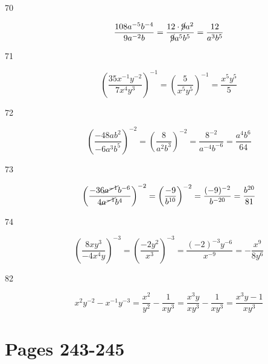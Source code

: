 \documentclass[fleqn,addpoints]{exam}
\begin{document}
\begin{description}
\item[70]
\[
  \frac{108a^{-5}b^{-4}}{9a^{-2}b} = \frac{12 \cdot \cancel{9}a^2}{\cancel{9}a^5b^5} = \frac{12}{a^3b^5}
\]

\item[71]
\[
  \left( \frac{35x^{-1}y^{-2}}{7x^4y^3} \right)^{-1} = \left( \frac{5}{x^5y^5} \right)^{-1} = \frac{x^5y^5}{5}
\]

\item[72]
\[
  \left( \frac{-48ab^2}{-6a^3b^5} \right)^{-2} = \left( \frac{8}{a^2b^3} \right)^{-2} = \frac{8^{-2}}{a^{-4}b^{-6}} = \frac{a^4b^6}{64}
\]

\item[73]
\[
  \left( \frac{-36 \cancel{a^{-1}} b^{-6}}{4 \cancel{a^{-1}} b^4} \right)^{-2} = \left( \frac{-9}{b^{10}} \right)^{-2} 
  = \frac{(-9)^{-2}}{b^{-20}} = \frac{b^{20}}{81}
\]

\item[74]
\[
  \left( \frac{8xy^3}{-4x^4y} \right)^{-3} = \left( \frac{-2y^2}{x^3} \right)^{-3} = \frac{(-2)^{-3}y^{-6}}{x^{-9}}
  = - \frac{x^9}{8y^6}
\]

\item[82]
\[
  x^2y^{-2} - x^{-1}y^{-3} = \frac{x^2}{y^2} - \frac{1}{xy^3} = \frac{x^3y}{xy^3} - \frac{1}{xy^3} = \frac{x^3y - 1}{xy^3}
\]

\end{description}

\section{Pages 243-245}
\end{document}
